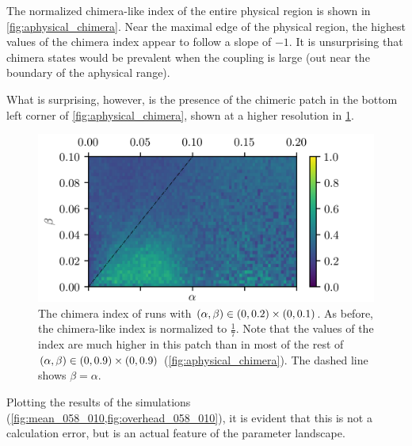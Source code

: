 The normalized chimera-like index of the entire physical region is shown in \cref{fig:aphysical_chimera}.
Near the maximal edge of the physical region, the highest values of the chimera index appear to follow a slope of $-1$.
It is unsurprising that chimera states would be prevalent when the coupling is large (out near the boundary of the aphysical range).

What is surprising, however, is the presence of the chimeric patch in the bottom left corner of \cref{fig:aphysical_chimera}, shown at a higher resolution in \cref{fig:zoom_chimera}.
\begin{figure}[ht]
  \centering
  \includegraphics{figure/zoom_chimera}
  \caption[Zoomed landscape]{The chimera index of runs with $(\alpha, \beta) \in (0, 0.2) \times (0, 0.1)$.
    As before, the chimera-like index is normalized to $\frac{1}{7}$.
    Note that the values of the index are much higher in this patch than in most of the rest of $(\alpha, \beta) \in (0, 0.9) \times (0, 0.9)$ (\cref{fig:aphysical_chimera}).
    The dashed line shows $\beta = \alpha$.
  }
  \label{fig:zoom_chimera}
\end{figure}
Plotting the results of the simulations (\cref{fig:mean_058_010,fig:overhead_058_010}),
it is evident that this is not a calculation error, but is an actual feature of the parameter landscape.
